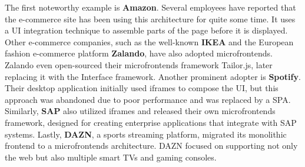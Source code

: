 \noindent
The first noteworthy example is \textbf{Amazon}. Several employees have reported that the e-commerce site has been using this architecture for quite some time. It uses a UI integration technique to assemble parts of the page before it is displayed. Other e-commerce companies, such as the well-known \textbf{IKEA} and the European fashion e-commerce platform \textbf{Zalando}, have also adopted microfrontends. Zalando even open-sourced their microfrontends framework Tailor.js, later replacing it with the Interface framework. Another prominent adopter is \textbf{Spotify}. Their desktop application initially used iframes to compose the UI, but this approach was abandoned due to poor performance and was replaced by a SPA. Similarly, \textbf{SAP} also utilized iframes and released their own microfrontends framework, designed for creating enterprise applications that integrate with SAP systems. Lastly, \textbf{DAZN}, a sports streaming platform, migrated its monolithic frontend to a microfrontends architecture. DAZN focused on supporting not only the web but also multiple smart TVs and gaming consoles.\cite{MicrofrontendsInAction} \cite{BuildingMicrofrontends}

